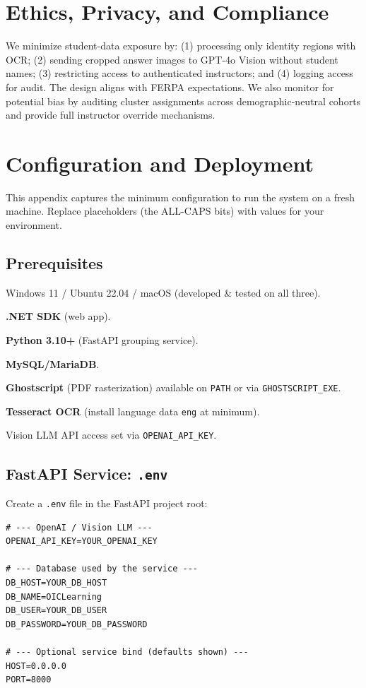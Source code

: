 \documentclass[ms,twoside,print]{nuthesis}
\begin{document}
\chapter{Ethics, Privacy, and Compliance}
We minimize student-data exposure by: (1) processing only identity regions with OCR; (2) sending cropped answer images to GPT-4o Vision without student names; (3) restricting access to authenticated instructors; and (4) logging access for audit. The design aligns with FERPA expectations\cite{FERPA1974}. We also monitor for potential bias by auditing cluster assignments across demographic-neutral cohorts and provide full instructor override mechanisms.


\appendix

\chapter{Configuration and Deployment}\label{app:config}

This appendix captures the minimum configuration to run the system on a fresh machine.
Replace placeholders (the ALL-CAPS bits) with values for your environment.

\lstset{basicstyle=\ttfamily\footnotesize,breaklines=true,columns=fullflexible}

\section{Prerequisites}
\begin{compactitem}
  \item Windows 11 / Ubuntu 22.04 / macOS (developed \& tested on all three).
  \item \textbf{.NET SDK} (web app).
  \item \textbf{Python 3.10+} (FastAPI grouping service).
  \item \textbf{MySQL/MariaDB}.
  \item \textbf{Ghostscript} (PDF rasterization) available on \texttt{PATH} or via \texttt{GHOSTSCRIPT\_EXE}.
  \item \textbf{Tesseract OCR} (install language data \texttt{eng} at minimum).
  \item Vision LLM API access set via \texttt{OPENAI\_API\_KEY}.
\end{compactitem}

\section{FastAPI Service: \texttt{.env}}
Create a \texttt{.env} file in the FastAPI project root:
\begin{lstlisting}
# --- OpenAI / Vision LLM ---
OPENAI_API_KEY=YOUR_OPENAI_KEY

# --- Database used by the service ---
DB_HOST=YOUR_DB_HOST
DB_NAME=OICLearning
DB_USER=YOUR_DB_USER
DB_PASSWORD=YOUR_DB_PASSWORD

# --- Optional service bind (defaults shown) ---
HOST=0.0.0.0
PORT=8000
\end{lstlisting}
\end{document}
